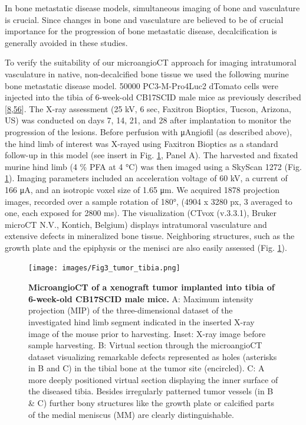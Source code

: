 In bone metastatic disease models, simultaneous imaging of bone and vasculature is crucial.
Since changes in bone and vasculature are believed to be of crucial importance for the progression of bone metastatic disease, decalcification is generally avoided in these studies.

To verify the suitability of our microangioCT approach for imaging intratumoral vasculature in native, non-decalcified bone tissue we used the following murine bone metastatic disease model.
50000 PC3-M-Pro4Luc2 dTomato cells were injected into the tibia of 6-week-old CB17SCID male mice as previously described {[}\protect\hyperlink{ref-16lhxZOpa}{8},\protect\hyperlink{ref-C9ratYNO}{56}{]}.
The X-ray assessment (25 kV, 6 sec, Faxitron Bioptics, Tucson, Arizona, US) was conducted on days 7, 14, 21, and 28 after implantation to monitor the progression of the lesions.
Before perfusion with μAngiofil (as described above), the hind limb of interest was X-rayed using Faxitron Bioptics as a standard follow-up in this model (see insert in Fig. \ref{fig:3}, Panel A).
The harvested and fixated murine hind limb (4 \% PFA at 4 °C) was then imaged using a SkyScan 1272 (Fig. \ref{fig:3}).
Imaging parameters included an acceleration voltage of 60 kV, a current of 166 μA, and an isotropic voxel size of 1.65 μm.
We acquired 1878 projection images, recorded over a sample rotation of 180°, (4904 x 3280 px, 3 averaged to one, each exposed for 2800 ms).
The visualization (CTvox (v.3.3.1), Bruker microCT N.V., Kontich, Belgium) displays intratumoral vasculature and extensive defects in mineralized bone tissue.
Neighboring structures, such as the growth plate and the epiphysis or the menisci are also easily assessed (Fig. \ref{fig:3}).

\begin{figure}
\hypertarget{fig:3}{%
\centering
\texttt{[image: images/Fig3\_tumor\_tibia.png]}
\caption{\textbf{MicroangioCT of a xenograft tumor implanted into tibia of 6-week-old CB17SCID male mice.}
A: Maximum intensity projection (MIP) of the three-dimensional dataset of the investigated hind limb segment indicated in the inserted X-ray image of the mouse prior to harvesting.
Inset: X-ray image before sample harvesting.
B: Virtual section through the microangioCT dataset visualizing remarkable defects represented as holes (asterisks in B and C) in the tibial bone at the tumor site (encircled).
C: A more deeply positioned virtual section displaying the inner surface of the diseased tibia.
Besides irregularly patterned tumor vessels (in B \& C) further bony structures like the growth plate or calcified parts of the medial meniscus (MM) are clearly distinguishable.}\label{fig:3}
}
\end{figure}

